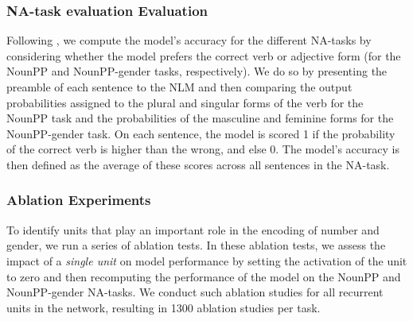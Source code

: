 % 
\subsubsection{NA-task evaluation Evaluation}
Following \citet{Linzen:etal:2016}, we compute the model's accuracy for the different NA-tasks by considering whether the model prefers the correct verb or adjective form (for the NounPP and NounPP-gender tasks, respectively).
We do so by presenting the preamble of each sentence to the NLM and then comparing the output probabilities assigned to the plural and singular forms of the verb for the NounPP task and the probabilities of the masculine and feminine forms for the NounPP-gender task.
On each sentence, the model is scored 1 if the probability of the correct verb is higher than the wrong, and else 0. 
The model's accuracy is then defined as the average of these scores across all sentences in the NA-task. 

\subsubsection{Ablation Experiments}
To identify units that play an important role in the encoding of number and gender, we run a series of ablation tests.
In these ablation tests, we assess the impact of a \emph{single unit} on model performance by setting the activation of the unit to zero and then recomputing the performance of the model on the NounPP and NounPP-gender NA-tasks. 
We conduct such ablation studies for all recurrent units in the network, resulting in 1300 ablation studies per task.

